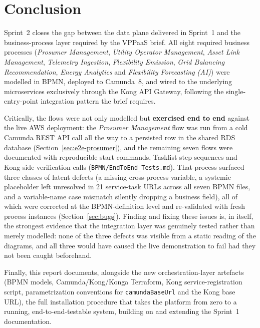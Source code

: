 \documentclass[11pt,a4paper]{article}
\begin{document}
\section{Conclusion}
 
Sprint~2 closes the gap between the data plane delivered in Sprint~1 and the
business-process layer required by the VPPaaS brief. All eight required
business processes (\emph{Prosumer Management}, \emph{Utility Operator
Management}, \emph{Asset Link Management}, \emph{Telemetry Ingestion},
\emph{Flexibility Emission}, \emph{Grid Balancing Recommendation},
\emph{Energy Analytics} and \emph{Flexibility Forecasting (AI)}) were
modelled in BPMN, deployed to Camunda~8, and wired to the underlying
microservices exclusively through the Kong API Gateway, following the
single-entry-point integration pattern the brief requires.
 
Critically, the flows were not only modelled but \textbf{exercised end to
end} against the live AWS deployment: the \emph{Prosumer Management} flow was
run from a cold Camunda REST API call all the way to a persisted row in the
shared RDS database (Section~\ref{sec:e2e-prosumer}), and the remaining seven
flows were documented with reproducible start commands, Tasklist step
sequences and Kong-side verification calls
(\texttt{BPMN/EndToEnd\_Tests.md}). That process surfaced three
classes of latent defects (a missing cross-process variable, a systemic
placeholder left unresolved in 21 service-task URLs across all seven BPMN
files, and a variable-name case mismatch silently dropping a business field),
all of which were corrected at the BPMN-definition level and re-validated
with fresh process instances (Section~\ref{sec:bugs}). Finding and fixing
these issues is, in itself, the strongest evidence that the integration layer
was genuinely tested rather than merely modelled: none of the three defects
was visible from a static reading of the diagrams, and all three would have
caused the live demonstration to fail had they not been caught beforehand.
 
Finally, this report documents, alongside the new orchestration-layer
artefacts (BPMN models, Camunda/Kong/Konga Terraform, Kong service-registration
script, parametrization conventions for \texttt{camundaBaseUrl} and the Kong
base URL), the full installation procedure that takes the platform from
zero to a running, end-to-end-testable system, building on and extending the
Sprint~1 documentation.
 
\end{document}
